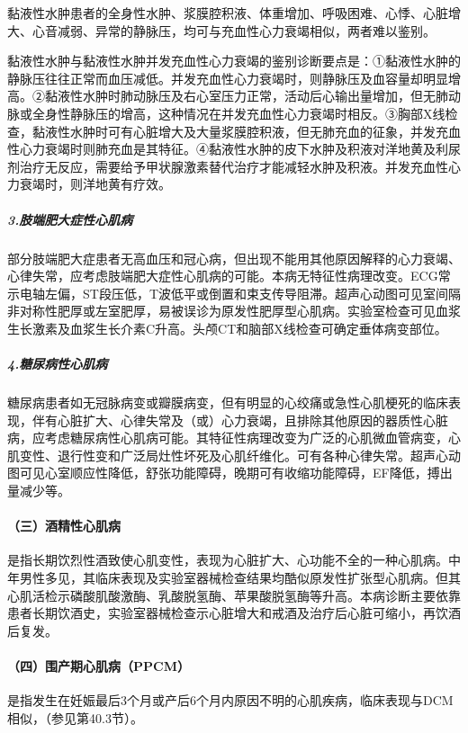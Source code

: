 黏液性水肿患者的全身性水肿、浆膜腔积液、体重增加、呼吸困难、心悸、心脏增大、心音减弱、异常的静脉压，均可与充血性心力衰竭相似，两者难以鉴别。

黏液性水肿与黏液性水肿并发充血性心力衰竭的鉴别诊断要点是：①黏液性水肿的静脉压往往正常而血压减低。并发充血性心力衰竭时，则静脉压及血容量却明显增高。②黏液性水肿时肺动脉压及右心室压力正常，活动后心输出量增加，但无肺动脉或全身性静脉压的增高，这种情况在并发充血性心力衰竭时相反。③胸部X线检查，黏液性水肿时可有心脏增大及大量浆膜腔积液，但无肺充血的征象，并发充血性心力衰竭时则肺充血是其特征。④黏液性水肿的皮下水肿及积液对洋地黄及利尿剂治疗无反应，需要给予甲状腺激素替代治疗才能减轻水肿及积液。并发充血性心力衰竭时，则洋地黄有疗效。

\subparagraph{3.肢端肥大症性心肌病}

部分肢端肥大症患者无高血压和冠心病，但出现不能用其他原因解释的心力衰竭、心律失常，应考虑肢端肥大症性心肌病的可能。本病无特征性病理改变。ECG常示电轴左偏，ST段压低，T波低平或倒置和束支传导阻滞。超声心动图可见室间隔非对称性肥厚或左室肥厚，易被误诊为原发性肥厚型心肌病。实验室检查可见血浆生长激素及血浆生长介素C升高。头颅CT和脑部X线检查可确定垂体病变部位。

\subparagraph{4.糖尿病性心肌病}

糖尿病患者如无冠脉病变或瓣膜病变，但有明显的心绞痛或急性心肌梗死的临床表现，伴有心脏扩大、心律失常及（或）心力衰竭，且排除其他原因的器质性心脏病，应考虑糖尿病性心肌病可能。其特征性病理改变为广泛的心肌微血管病变，心肌变性、退行性变和广泛局灶性坏死及心肌纤维化。可有各种心律失常。超声心动图可见心室顺应性降低，舒张功能障碍，晚期可有收缩功能障碍，EF降低，搏出量减少等。

\paragraph{（三）酒精性心肌病}

是指长期饮烈性酒致使心肌变性，表现为心脏扩大、心功能不全的一种心肌病。中年男性多见，其临床表现及实验室器械检查结果均酷似原发性扩张型心肌病。但其心肌活检示磷酸肌酸激酶、乳酸脱氢酶、苹果酸脱氢酶等升高。本病诊断主要依靠患者长期饮酒史，实验室器械检查示心脏增大和戒酒及治疗后心脏可缩小，再饮酒后复发。

\paragraph{（四）围产期心肌病（PPCM）}

是指发生在妊娠最后3个月或产后6个月内原因不明的心肌疾病，临床表现与DCM相似，（参见第40.3节）。

